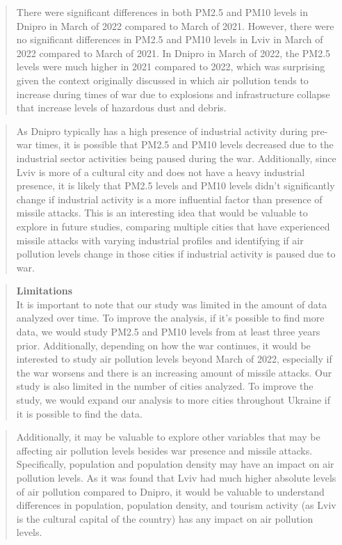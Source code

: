\documentclass[
  12pt,
]{article}
\begin{document}
\begin{quote}
There were significant differences in both PM2.5 and PM10 levels in
Dnipro in March of 2022 compared to March of 2021. However, there were
no significant differences in PM2.5 and PM10 levels in Lviv in March of
2022 compared to March of 2021. In Dnipro in March of 2022, the PM2.5
levels were much higher in 2021 compared to 2022, which was surprising
given the context originally discussed in which air pollution tends to
increase during times of war due to explosions and infrastructure
collapse that increase levels of hazardous dust and debris.
\end{quote}

\begin{quote}
As Dnipro typically has a high presence of industrial activity during
pre-war times, it is possible that PM2.5 and PM10 levels decreased due
to the industrial sector activities being paused during the war.
Additionally, since Lviv is more of a cultural city and does not have a
heavy industrial presence, it is likely that PM2.5 levels and PM10
levels didn't significantly change if industrial activity is a more
influential factor than presence of missile attacks. This is an
interesting idea that would be valuable to explore in future studies,
comparing multiple cities that have experienced missile attacks with
varying industrial profiles and identifying if air pollution levels
change in those cities if industrial activity is paused due to war.
\end{quote}

\begin{quote}
\textbf{Limitations}\\
It is important to note that our study was limited in the amount of data
analyzed over time. To improve the analysis, if it's possible to find
more data, we would study PM2.5 and PM10 levels from at least three
years prior. Additionally, depending on how the war continues, it would
be interested to study air pollution levels beyond March of 2022,
especially if the war worsens and there is an increasing amount of
missile attacks. Our study is also limited in the number of cities
analyzed. To improve the study, we would expand our analysis to more
cities throughout Ukraine if it is possible to find the data.
\end{quote}

\begin{quote}
Additionally, it may be valuable to explore other variables that may be
affecting air pollution levels besides war presence and missile attacks.
Specifically, population and population density may have an impact on
air pollution levels. As it was found that Lviv had much higher absolute
levels of air pollution compared to Dnipro, it would be valuable to
understand differences in population, population density, and tourism
activity (as Lviv is the cultural capital of the country) has any impact
on air pollution levels.
\end{quote}
\end{document}
